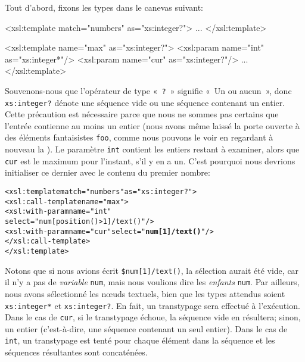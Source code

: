 \noindent Tout d'abord, fixons les types dans le canevas suivant:
\begin{sverb}
  <xsl:template match="numbers" as="xs:integer?">
    ...
  </xsl:template>

  <xsl:template name="max" as="xs:integer?">
    <xsl:param name="int" as="xs:integer*"/>
    <xsl:param name="cur" as="xs:integer?"/>
    ...
  </xsl:template>
\end{sverb}
Souvenons-nous que l'opérateur de type «~\texttt{?}~» signifie «~Un ou
aucun~», donc \texttt{xs:integer?} dénote une séquence vide ou une
séquence contenant un entier. Cette précaution est nécessaire parce
que nous ne sommes pas certains que l'entrée contienne au moins un
entier (nous avons même laissé la porte ouverte à des éléments
fantaisistes \texttt{foo}, comme nous pouvons le voir en regardant à
nouveau la \DTD). Le paramètre \texttt{int} contient les entiers
restant à examiner, alors que \texttt{cur} est le maximum pour
l'instant, s'il y en a un. C'est pourquoi nous devrions initialiser ce
dernier avec le contenu du premier nombre:
\begin{alltt}
\small  <xsl:template match="numbers" as="xs:integer?">
    <xsl:call-template name="max">
      <xsl:with-param name="int"
                      select="num[position()>1]/text()"/>
      <xsl:with-param name="cur" select="\textbf{num[1]/text()}"/>
    </xsl:call-template>
  </xsl:template>
\end{alltt}
Notons que si nous avions écrit \texttt{\$num[1]/text()}, la sélection
aurait été vide, car il n'y a pas de \emph{variable} \texttt{num},
mais nous voulions dire les \emph{enfants} \texttt{num}. Par ailleurs,
nous avons sélectionné les n{\oe}uds textuels, bien que les types
attendus soient \texttt{xs:integer*} et \texttt{xs:integer?}. En fait,
un transtypage sera effectué à l'exécution. Dans le cas de
\texttt{cur}, si le transtypage échoue, la séquence vide en résultera;
sinon, un entier (c'est-à-dire, une séquence contenant un seul
entier). Dans le cas de \texttt{int}, un transtypage est tenté pour
chaque élément dans la séquence et les séquences résultantes sont
concaténées.

